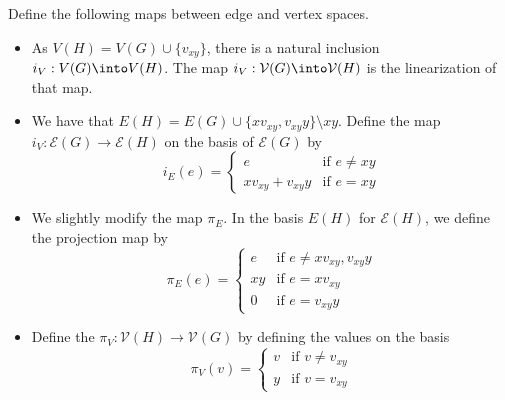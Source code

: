 
    \begin{claim} 
    Define the following maps between edge and vertex spaces. 
    \begin{itemize}
    \item As $V(H)= V(G)\cup\{v_{xy}\}$, there is a natural inclusion $i_V:V(G)\into V(H)$. The map $i_V: \mathcal V(G)\into \mathcal V(H)$ is the linearization of that map. 
    \item We have that $E(H)=E(G)\cup \{xv_{xy},v_{xy}y\}\setminus xy.$ Define the map $i_V:\mathcal E(G)\to \mathcal E(H)$ on the basis of $\mathcal E(G)$ by \[i_E(e)=\left\{\begin{array}{ll} e & \text{if $e\neq xy$}\\ xv_{xy}+v_{xy}y & \text{if $e=xy$}\end{array}\right.\]
    \item We slightly modify the map $\pi_E$. In the basis $E(H)$ for $\mathcal E(H)$, we define the projection map by \[\pi_E(e)=\left\{\begin{array}{ll} e & \text{if $e\neq xv_{xy},v_{xy}y $}\\  xy & \text{if $e=xv_{xy}$}\\  0 & \text{if $e=v_{xy}y$}\end{array}\right.\]
    \item Define the $\pi_V:\mathcal V(H)\to \mathcal V(G)$ by defining the values on the basis  
    \[\pi_V(v)=\left\{\begin{array}{ll} v & \text{if $v\neq v_{xy}$}\\  y& \text{if $v=v_{xy}$}\end{array}\right.\]
    \end{itemize}
    
    \end{claim}
    
